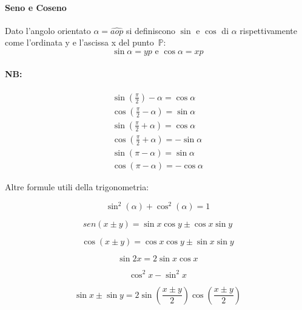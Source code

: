  \paragraph{Seno e Coseno}
 Dato l'angolo orientato $\alpha=\widehat {aop}$ si definiscono $\sin$ e $\cos$ di $\alpha$ rispettivamente come l'ordinata y e l'ascissa x del punto~$\mathbb{P}$:
 \[
 \sin \alpha =yp
 \text{ e }
 \cos \alpha =xp
 \]
 
\paragraph{NB:}
 \begin{gather}
    \sin(\frac{\pi}{2})-\alpha=\cos\alpha\\
    \cos(\frac{\pi}{2}-\alpha)=\sin\alpha\\
    \sin(\frac{\pi}{2}+\alpha)=\cos\alpha\\
    \cos(\frac{\pi}{2}+\alpha)=-\sin\alpha\\
    \sin(\pi-\alpha)=\sin\alpha\\
    \cos(\pi-\alpha)=-\cos\alpha
 \end{gather}
 
 Altre formule utili della trigonometria:
 
 \begin{form}
 \[
 \sin^2(\alpha)+\cos^2(\alpha)=1
 \]
 \end{form}
 
 \begin{form}
 \[
 sen(x\pm y)=\sin x \cos y\pm\cos x \sin y
 \]
 \end{form}
 
 \begin{form}
 \[
 \cos(x\pm y)=\cos x\cos y\pm\sin x \sin y
 \]
 \end{form}
 
 \begin{form}
	\[
	\sin 2x=2\sin x\cos x
	\]
 \end{form}
 
 \begin{form} 
\[
\cos^2 x-\sin^2 x
\]
 \end{form}
 
 \begin{form}
 \[
 \sin x \pm \sin y=2\sin(\frac{x\pm y}{2}) \cos(\frac{x \pm y}{2})
 \]
 \end{form}

